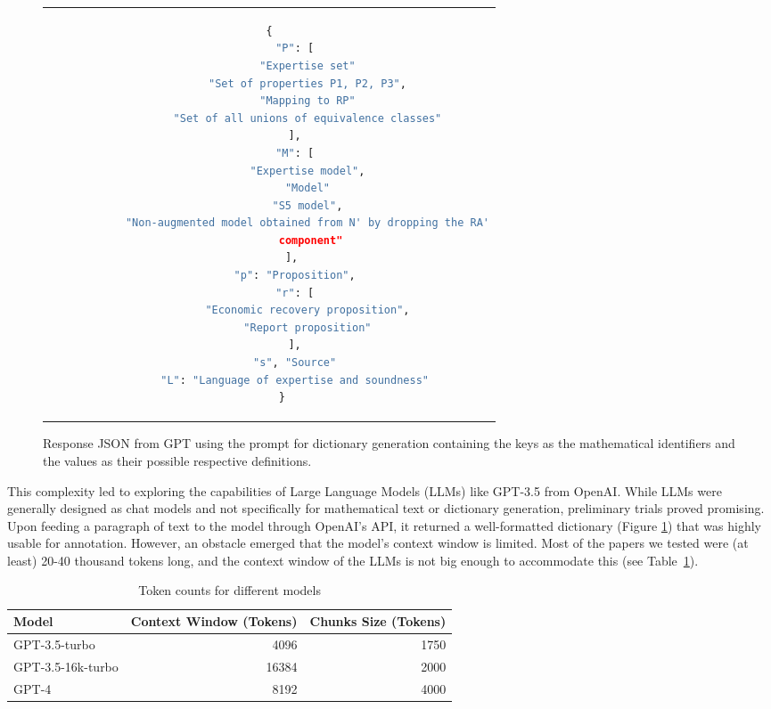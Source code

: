 \begin{figure}[htpb]
  \centering
  \begin{tabular}{c}
  \begin{lstlisting}[language=python]
    {
        "P": [
            "Expertise set"
            "Set of properties P1, P2, P3",
            "Mapping to RP"
            "Set of all unions of equivalence classes"
        ],
        "M": [
            "Expertise model",
            "Model"
            "S5 model",
            "Non-augmented model obtained from N' by dropping the RA'
             component"
        ], 
        "p": "Proposition",
        "r": [
            "Economic recovery proposition",
            "Report proposition"
        ],
        "s", "Source"
        "L": "Language of expertise and soundness"
    }
  \end{lstlisting}
  \end{tabular}
  \caption[Response from Main Prompt for Dictionary Generation]{Response JSON from GPT using the prompt for dictionary generation containing the keys as the mathematical identifiers and the values as their possible respective definitions.}\label{fig:dic_response}
\end{figure}

This complexity led to exploring the capabilities of Large Language Models (LLMs) like GPT-3.5 from OpenAI. While LLMs were generally designed as chat models and not specifically for mathematical text or dictionary generation, preliminary trials proved promising. Upon feeding a paragraph of text to the model through OpenAI's API, it returned a well-formatted dictionary (Figure \ref{fig:dic_response}) that was highly usable for annotation. However, an obstacle emerged that the model's context window is limited. Most of the papers we tested were (at least) 20-40 thousand tokens long, and the context window of the LLMs is not big enough to accommodate this (see Table~\ref{tab:token_counts}).

\begin{table}[h]
    \centering
    \begin{tabular}{lrr}
        \hline
        Model & Context Window (Tokens) & Chunks Size (Tokens)\\
        \hline
        GPT-3.5-turbo & 4096 & 1750 \\
        GPT-3.5-16k-turbo & 16384 & 2000 \\
        GPT-4 & 8192 & 4000 \\
        \hline
    \end{tabular}
    \caption{Token counts for different models}
    \label{tab:token_counts}
\end{table}

